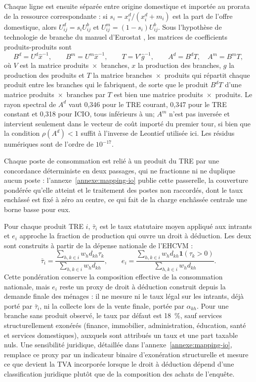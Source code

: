 \documentclass[11pt,a4paper]{article}
\begin{document}
Chaque ligne est ensuite séparée entre origine domestique et importée au prorata
de la ressource correspondante : si $s_i=x_i^d/(x_i^d+m_i)$ est la part de
l'offre domestique, alors $U^d_{ij}=s_iU^b_{ij}$ et
$U^m_{ij}=(1-s_i)U^b_{ij}$. Sous l'hypothèse de technologie de branche du manuel
d'Eurostat \citep{eurostat2008}, les matrices de coefficients produits-produits
sont
\begin{equation}
B^d=U^d\widehat{x}^{-1},\qquad
B^m=U^m\widehat{x}^{-1},\qquad
T=V'\widehat{g}^{-1},\qquad
A^d=B^dT,\quad A^m=B^mT,
\label{eq:sut-product}
\end{equation}
où $V$ est la matrice produits~$\times$~branches, $x$ la production des
branches, $g$ la production des produits et $T$ la matrice
branches~$\times$~produits qui répartit chaque produit entre les branches qui le
fabriquent, de sorte que le produit $B^dT$ d'une matrice
produits~$\times$~branches par $T$ est bien une matrice
produits~$\times$~produits. Le rayon spectral de $A^d$ vaut 0,346 pour le TRE
courant, 0,347 pour le TRE constant et 0,318 pour ICIO, tous inférieurs à un;
$A^m$ n'est pas inversée et intervient seulement dans le vecteur de coût importé
du premier tour, si bien que la condition $\rho(A^d)<1$ suffit à l'inverse de
Leontief utilisée ici. Les résidus numériques sont de l'ordre de $10^{-17}$.

Chaque poste de consommation est relié à un produit du TRE par une concordance
déterministe en deux passages, qui ne fractionne ni ne duplique aucun poste :
l'annexe~\ref{annexe:mapping-io} publie cette passerelle, la couverture pondérée
qu'elle atteint et le traitement des postes non raccordés, dont le taux enchâssé
est fixé à zéro au centre, ce qui fait de la charge enchâssée centrale une borne
basse pour eux.

Pour chaque produit TRE $i$, $\bar\tau_i$ est le taux statutaire moyen appliqué
aux intrants et $e_i$ approche la fraction de production qui ouvre un droit à
déduction. Les deux sont construits à partir de la dépense nationale de
l'EHCVM :
\begin{equation}
\bar\tau_i=
\frac{\sum_{h,k\in i}w_h d_{kh}\tau_k}
     {\sum_{h,k\in i}w_h d_{kh}},\qquad
e_i=
\frac{\sum_{h,k\in i}w_h d_{kh}\mathbf 1(\tau_k>0)}
     {\sum_{h,k\in i}w_h d_{kh}}.
\label{eq:sector-rates}
\end{equation}
Cette pondération conserve la composition effective de la consommation
nationale, mais $e_i$ reste un proxy de droit à déduction construit depuis la
demande finale des ménages : il ne mesure ni le taux légal sur les intrants,
déjà porté par $\bar\tau_i$, ni la collecte lors de la vente finale, portée par
$\alpha_{kh}$. Pour une branche sans produit observé, le taux par défaut est
18~\%, sauf services structurellement exonérés (finance, immobilier,
administration, éducation, santé et services domestiques), auxquels sont
attribués un taux et une part taxable nuls. Une sensibilité juridique, détaillée
dans l'annexe~\ref{annexe:mapping-io}, remplace ce proxy par un indicateur
binaire d'exonération structurelle et mesure ce que devient la TVA incorporée
lorsque le droit à déduction dépend d'une classification juridique plutôt que de
la composition des achats de l'enquête.
\end{document}
